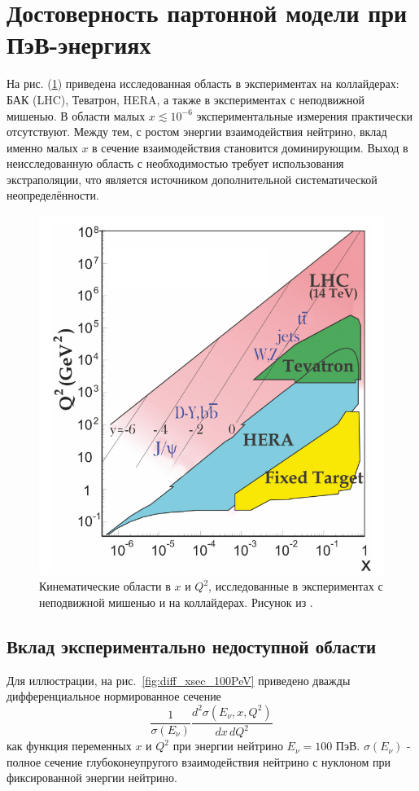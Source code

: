 \section{Достоверность партонной модели при ПэВ-энергиях}
\label{sec:dis_reliability}
На рис. (\ref{fig:xQ2_PDG}) приведена исследованная область в экспериментах на коллайдерах:   БАК (LHC), Теватрон, HERA, а также в экспериментах с неподвижной мишенью. В области малых $x\lesssim 10^{-6}$ экспериментальные измерения практически отсутствуют. Между тем, с ростом энергии взаимодействия нейтрино, вклад именно малых $x$ в сечение взаимодействия становится доминирующим. Выход в неисследованную область с необходимостью требует использования экстраполяции, что является источником дополнительной систематической неопределённости. 
\begin{figure}[!h]
\centering
\includegraphics[width=0.8\linewidth]{images/NuProp/reald}
\caption{Кинематические области в $x$ и $Q^2$, исследованные в экспериментах с неподвижной мишенью и на коллайдерах. Рисунок из \cite{ParticleDataGroup:2024cfk}.}
\label{fig:xQ2_PDG}
\end{figure}

\subsection{Вклад экспериментально недоступной области}
Для иллюстрации, на рис.~\ref{fig:diff_xsec_100PeV} приведено дважды дифференциальное нормированное сечение
\[
\frac{1}{\sigma(E_\nu)}\frac{d^2\sigma(E_\nu,x,Q^2)}{dx\,dQ^2}
\] 
как функция переменных $x$ и $Q^2$ при энергии нейтрино $E_{\nu} = 100$ ПэВ. $\sigma(E_\nu)$ - полное сечение глубоконеупругого взаимодействия нейтрино с нуклоном при фиксированной энергии нейтрино. 

